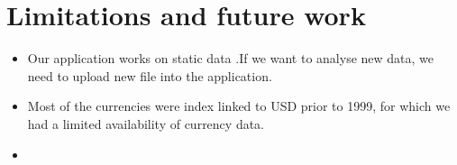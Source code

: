 \section{Limitations and future work}

\begin{itemize}
	\item Our application works on static data .If we want to analyse new data, we need to upload new file into the application.
	\item Most of the currencies were index linked to USD prior to 1999, for which we had a limited availability of currency data.
	\item
\end{itemize}



 







